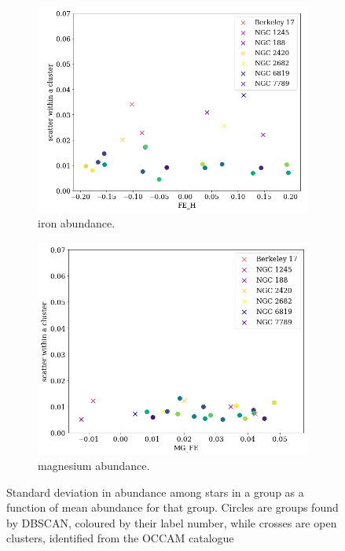 \documentclass[11pt]{article}
\begin{document}
\begin{figure}
  \centering
  \begin{subfigure}[b]{0.45\textwidth}
    \includegraphics[width=\textwidth]{compactness.png}
   \caption{iron abundance.}
  \label{fig:fecompact}
  \end{subfigure}
\hfill
  \begin{subfigure}[b]{0.45\textwidth}
    \includegraphics[width=\textwidth]{mgcompactness.png}
  \caption{magnesium abundance.}  
  \label{fig:mgcompact}
  \end{subfigure}
  \hfill
    \caption{Standard deviation in abundance among stars in a group as a function of mean abundance for that group. Circles are groups found by DBSCAN, coloured by their label number, while crosses are open clusters, identified from the OCCAM catalogue \citep{Donor2018}}
    \label{fig:compact}
\end{figure}
\end{document}
